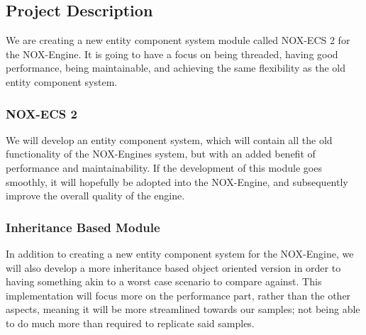 \subsection{Project Description}
We are creating a new entity component system module called NOX-ECS 2 for the NOX-Engine. 
It is going to have a focus on being threaded, having good performance, being maintainable, and achieving the same flexibility as the old entity component system.

\subsubsection{NOX-ECS 2}
We will develop an entity component system, which will contain all the old functionality of the NOX-Engines system, but with an added benefit of performance and maintainability. 
If the development of this module goes smoothly, it will hopefully be adopted into the NOX-Engine, and subsequently improve the overall quality of the engine.

\subsubsection{Inheritance Based Module}
In addition to creating a new entity component system for the NOX-Engine, we will also develop a more inheritance based object oriented version in order to having something akin to a worst case scenario to compare against. 
This implementation will focus more on the performance part, rather than the other aspects, meaning it will be more streamlined towards our samples; 
not being able to do much more than required to replicate said samples.